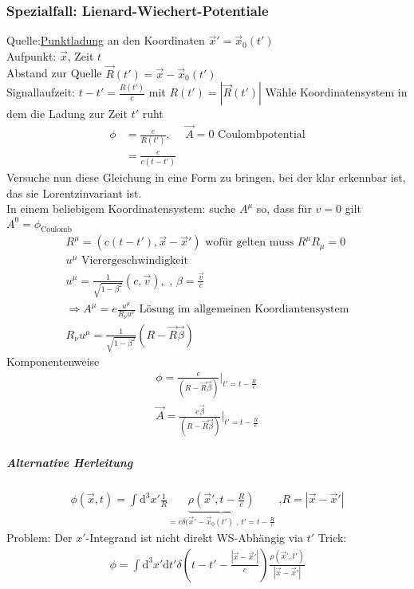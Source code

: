 \documentclass[a4paper]{article}
\begin{document}
\subsubsection{Spezialfall: Lienard-Wiechert-Potentiale}
Quelle:\underline{Punktladung} an den Koordinaten $\vec{x}'=\vec{x}_0(t')$ \\
Aufpunkt: $\vec{x}$, Zeit $t$\\
Abstand zur Quelle $\vec{R}(t')=\vec{x}-\vec{x}_0(t')$\\
Signallaufzeit: $t-t'=\frac{R(t')}{c}$ mit $R(t')=|\vec{R}(t')|$
Wähle Koordinatensystem in dem die Ladung zur Zeit $t'$ ruht
\begin{align}
\phi&=\frac{e}{R(t')}, & \vec{A}=0 \text{ Coulombpotential}\\
&=\frac{e}{c(t-t')}
\end{align}
Versuche nun diese Gleichung in eine Form zu bringen, bei der klar erkennbar
ist, das sie Lorentzinvariant ist.\\
In einem beliebigem Koordinatensystem: suche $A^\mu$ so, dass für $v=0$ gilt
$A^0=\phi_{\text{Coulomb}}$\\
\begin{align}
R^\mu=(c(t-t'),\vec{x}-\vec{x}') \text{ wofür gelten muss }R^\mu R_\mu=0\\
u^\mu \text{ Vierergeschwindigkeit}\\
u^\mu=\frac{1}{\sqrt{1-\beta^2}}(c,\vec{v}), \text{ , }
\beta=\frac{\vec{v}}{c}\\
\Rightarrow A^\mu=e\frac{u^\mu}{R_\nu u^\nu} \text{ Lösung im allgemeinen
Koordiantensystem}\\
R_\nu u^\mu=\frac{1}{\sqrt{1-\beta^2}}(R-\vec{R}\vec{\beta})
\end{align}
Komponentenweise
\begin{align}
\phi=\frac{e}{(R-\vec{R}\vec{\beta})}|_{t'=t-\frac{R}{c}}\\
\vec{A}=\frac{e\vec{\beta}}{(R-\vec{R}\vec{\beta})}|_{t'=t-\frac{R}{c}}
\end{align}
\subparagraph{Alternative Herleitung}
\begin{align}
\phi(\vec{x},t)=\int \mathrm{d}^3x' \frac{1}{R}
\underbrace{\rho(\vec{x}',t-\frac{R}{c})}_{=e
\delta(\vec{x}'-\vec{x}_0(t')\text{ , }t'=t-\frac{R}{c}} \text{ ,
}R=|\vec{x}-\vec{x}'|
\end{align}
Problem: Der $x'$-Integrand ist nicht direkt WS-Abhängig via $t'$
Trick: 
\begin{align}
\phi=\int \mathrm{d}^3x' \mathrm{d}t' \delta\left(t-t'-\frac{|\vec{x}-\vec{x}'|}{c}\right)
\frac{\rho(\vec{x}',t')}{|\vec{x}-\vec{x}'|}\\
\end{align}
\end{document}
